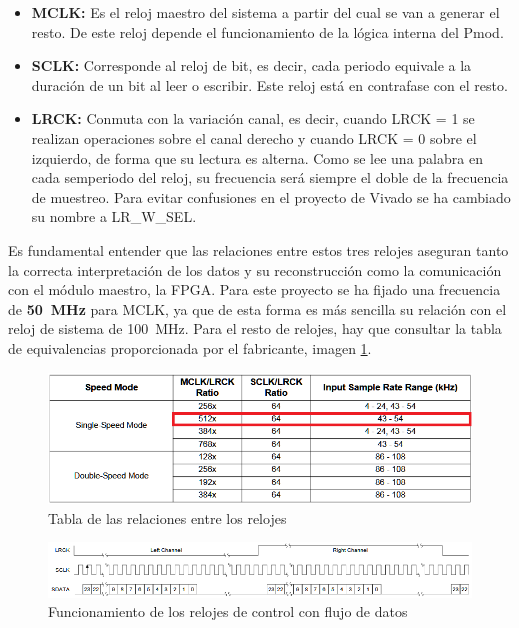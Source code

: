 \begin{itemize}
\item \textbf{MCLK:} Es el reloj maestro del sistema a partir del cual se van a generar el resto. De este reloj depende el funcionamiento de la lógica interna del Pmod.
\item \textbf{SCLK:} Corresponde al reloj de bit, es decir, cada periodo equivale a la duración de un bit al leer o escribir. Este reloj está en contrafase con el resto.
\item \textbf{LRCK:} Conmuta con la variación canal, es decir, cuando LRCK = 1 se realizan operaciones sobre el canal derecho y cuando LRCK = 0 sobre el izquierdo, de forma que su lectura es alterna. Como se lee una palabra en cada semperiodo del reloj, su frecuencia será siempre el doble de la frecuencia de muestreo. Para evitar confusiones en el proyecto de Vivado se ha cambiado su nombre a LR\_W\_SEL.
\end{itemize}

Es fundamental entender que las relaciones entre estos tres relojes aseguran tanto la correcta interpretación de los datos y su reconstrucción como la comunicación con el módulo maestro, la FPGA. Para este proyecto se ha fijado una frecuencia de \textbf{50~MHz} para MCLK, ya que de esta forma es más sencilla su relación con el reloj de sistema de 100~MHz. Para el resto de relojes, hay que consultar la tabla de equivalencias proporcionada por el fabricante, imagen \ref{fig:flujoreloj}.

\begin{figure}[!b]
\begin{center}
\includegraphics[width=15cm]{img/ratiosreloj.png}
\caption{\label{fig:flujoreloj}Tabla de las relaciones entre los relojes}
\end{center}
\end{figure}

\begin{figure}[!b]
\begin{center}
\includegraphics[width=14cm]{img/i2sov.png}
\caption{\label{fig:i2sov}Funcionamiento de los relojes de control con flujo de datos}
\end{center}
\end{figure}

